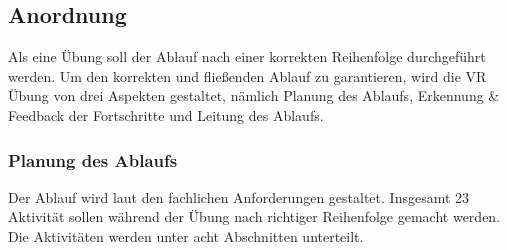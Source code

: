  \subsection{Anordnung}
 Als eine Übung soll der Ablauf nach einer korrekten Reihenfolge durchgeführt werden. Um den korrekten und fließenden Ablauf zu garantieren, wird die VR Übung von drei Aspekten gestaltet, nämlich Planung des Ablaufs, Erkennung \& Feedback der Fortschritte und Leitung des Ablaufs.
  \subsubsection{Planung des Ablaufs}
      
  Der Ablauf wird laut den fachlichen Anforderungen gestaltet. Insgesamt 23 Aktivität sollen während der Übung nach richtiger Reihenfolge gemacht werden. Die Aktivitäten werden unter acht Abschnitten unterteilt.
  
